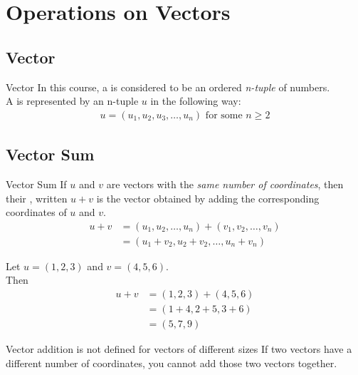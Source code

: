 \documentclass[../notes.tex]{subfiles}
\begin{document}
		\section{Operations on Vectors}
			\subsection{Vector}
				\begin{definition}{Vector}
					In this course, a  is considered to be an ordered \emph{n-tuple} of numbers.\\
					A  is represented by an n-tuple $u$ in the following way:
					\begin{align*}
						u = (u_{1}, u_{2}, u_{3}, \ldots, u_{n}) \text{ for some } n \geq 2
					\end{align*}
				\end{definition}
			\subsection{Vector Sum}
				\begin{definition}{Vector Sum}
					If $u$ and $v$ are vectors with the \emph{same number of coordinates}, then their , written $u + v$ is the vector obtained by adding the corresponding coordinates of $u$ and $v$.
					\begin{align*}
						u + v &= (u_{1}, u_{2}, \ldots, u_{n}) + (v_{1}, v_{2}, \ldots, v_{n})\\
						&= (u_{1} + v_{2}, u_{2} + v_{2}, \ldots, u_{n} + v_{n})
					\end{align*}
				\end{definition}
				\begin{example}[width=0.5\textwidth]
					Let $u = (1, 2, 3)$ and $v = (4, 5, 6)$.\\
					Then 
					\begin{align*}
						u + v &= (1, 2, 3) + (4, 5, 6)\\
						&= (1 + 4, 2 + 5, 3 + 6)\\
						&= (5, 7, 9)
					\end{align*} 
				\end{example}
				\begin{sidenote}{Vector addition is not defined for vectors of different sizes}
					If two vectors have a different number of coordinates, you cannot add those two vectors together.
				\end{sidenote}
			\pagebreak
\end{document}
